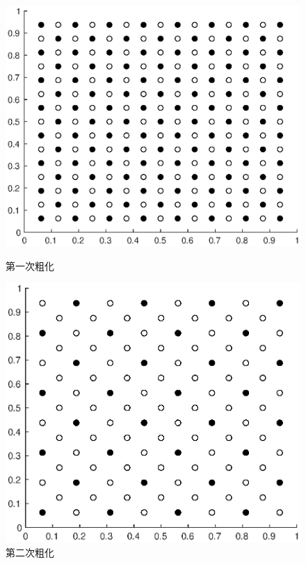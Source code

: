 \documentclass[lang=cn,10pt]{elegantbook}
\begin{document}
\begin{figure}[H]
  \centering
  \begin{minipage}[t]{0.32\linewidth}
      \centering
      \includegraphics[width=\linewidth]{figure/4-1-1.eps}
      \caption*{\small 第一次粗化}
  \end{minipage}
  \hspace{.5em}
  \begin{minipage}[t]{0.32\linewidth}
    \centering
    \includegraphics[width=0.9\linewidth]{figure/4-1-2.eps}
    \caption*{\small 第二次粗化}
  \end{minipage}

\end{figure}
\end{document}
